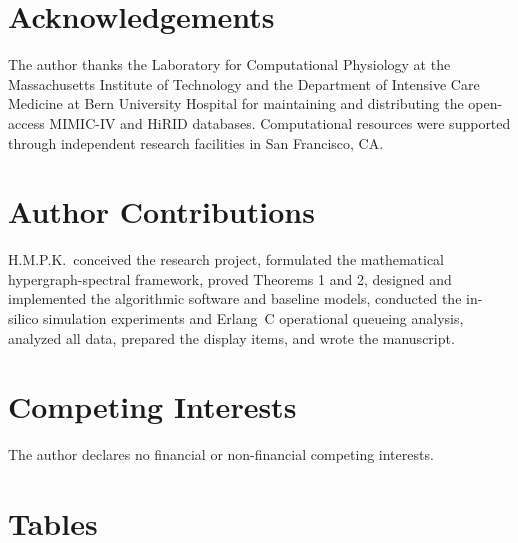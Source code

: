 \documentclass[12pt]{article}
\begin{document}
\section*{Acknowledgements}
The author thanks the Laboratory for Computational Physiology at the Massachusetts Institute of Technology and the Department of Intensive Care Medicine at Bern University Hospital for maintaining and distributing the open-access MIMIC-IV and HiRID databases. Computational resources were supported through independent research facilities in San Francisco, CA.

\section*{Author Contributions}
H.M.P.K.\ conceived the research project, formulated the mathematical hypergraph-spectral framework, proved Theorems 1 and 2, designed and implemented the algorithmic software and baseline models, conducted the in-silico simulation experiments and Erlang~C operational queueing analysis, analyzed all data, prepared the display items, and wrote the manuscript.

\section*{Competing Interests}
The author declares no financial or non-financial competing interests.




\newpage

\section*{Tables}
\end{document}
